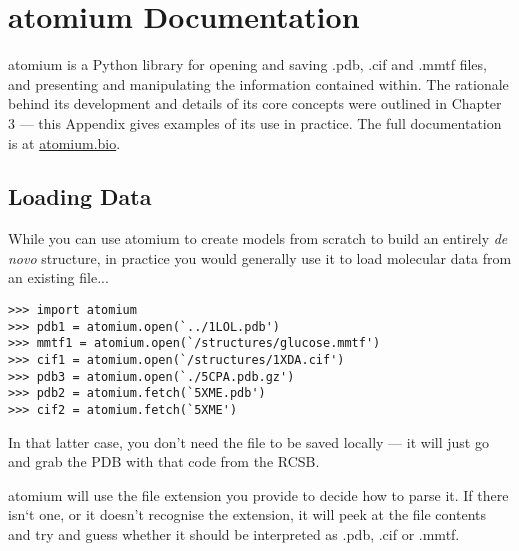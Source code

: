 



\chapter{atomium Documentation} %


atomium is a Python library for opening and saving .pdb, .cif and .mmtf files,
and presenting and manipulating the information contained within. The rationale behind its development and details of its core concepts were outlined in Chapter 3 --- this Appendix gives examples of its use in practice. The full documentation is at \url{atomium.bio}.

\section{Loading Data}

While you can use atomium to create models from scratch to build an entirely \emph{de novo} structure, in practice you would generally use it to load molecular data from an existing file...

\begin{footnotesize}
\begin{verbatim}
>>> import atomium
>>> pdb1 = atomium.open(`../1LOL.pdb')
>>> mmtf1 = atomium.open(`/structures/glucose.mmtf')
>>> cif1 = atomium.open(`/structures/1XDA.cif')
>>> pdb3 = atomium.open(`./5CPA.pdb.gz')
>>> pdb2 = atomium.fetch(`5XME.pdb')
>>> cif2 = atomium.fetch(`5XME')
\end{verbatim}
\end{footnotesize}

In that latter case, you don't need the file to be saved locally --- it will just go and grab the PDB with that code from the RCSB.

atomium will use the file extension you provide to decide how to parse it. If there isn`t one, or it doesn't recognise the extension, it will peek at the file contents and try and guess whether it should be interpreted as .pdb, .cif or .mmtf.

